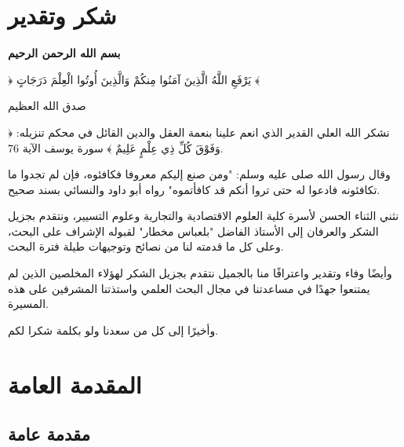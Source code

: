 \documentclass[12pt, a4paper, twoside]{report}
\begin{document}
\chapter*{شكر وتقدير}

\begin{center}
\vspace*{1cm}

{\Large \textbf{بسم الله الرحمن الرحيم}}

\vspace{0.5cm}

{﴿ يَرْفَعِ اللَّهُ الَّذِينَ آمَنُوا مِنكُمْ وَالَّذِينَ أُوتُوا الْعِلْمَ دَرَجَاتٍ ﴾}

\vspace{0.5cm}

صدق الله العظيم

\end{center}

\vspace{1cm}

نشكر الله العلي القدير الذي انعم علينا بنعمة العقل والدين القائل في محكم تنزيله: ﴿ وَفَوْقَ كُلِّ ذِي عِلْمٍ عَلِيمٌ ﴾ سورة يوسف الآية 76.

وقال رسول الله صلى عليه وسلم: "ومن صنع إليكم معروفا فكافئوه، فإن لم تجدوا ما تكافئونه فادعوا له حتى تروا أنكم قد كافأتموه" رواه أبو داود والنسائي بسند صحيح.

نثني الثناء الحسن لأسرة كلية العلوم الاقتصادية والتجارية وعلوم التسيير، ونتقدم بجزيل الشكر والعرفان إلى الأستاذ الفاضل "بلعباس مخطار" لقبوله الإشراف على البحث، وعلى كل ما قدمته لنا من نصائح وتوجيهات طيلة فترة البحث.

وأيضًا وفاء وتقدير واعترافًا منا بالجميل نتقدم بجزيل الشكر لهؤلاء المخلصين الذين لم يمتنعوا جهدًا في مساعدتنا في مجال البحث العلمي واستذتنا المشرفين على هذه المسيرة.

وأخيرًا إلى كل من سعدنا ولو بكلمة شكرا لكم.

\newpage

\chapter{المقدمة العامة}

\section{مقدمة عامة}
\end{document}
